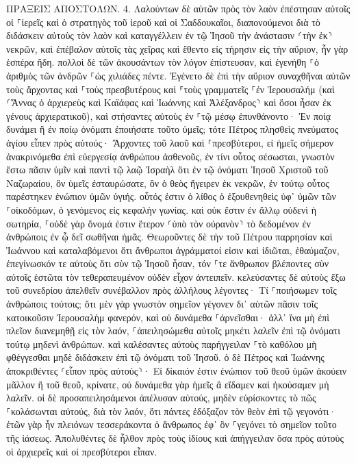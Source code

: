 \documentclass[twoside, 9pt]{extreport}
\begin{document}
ΠΡΑΞΕΙΣ ΑΠΟΣΤΟΛΩΝ.
4.
Λαλούντων δὲ αὐτῶν πρὸς τὸν λαὸν ἐπέστησαν αὐτοῖς οἱ ⸀ἱερεῖς καὶ ὁ στρατηγὸς τοῦ ἱεροῦ καὶ οἱ Σαδδουκαῖοι, 
διαπονούμενοι διὰ τὸ διδάσκειν αὐτοὺς τὸν λαὸν καὶ καταγγέλλειν ἐν τῷ Ἰησοῦ τὴν ἀνάστασιν ⸂τὴν ἐκ⸃ νεκρῶν, 
καὶ ἐπέβαλον αὐτοῖς τὰς χεῖρας καὶ ἔθεντο εἰς τήρησιν εἰς τὴν αὔριον, ἦν γὰρ ἑσπέρα ἤδη. 
πολλοὶ δὲ τῶν ἀκουσάντων τὸν λόγον ἐπίστευσαν, καὶ ἐγενήθη ⸀ὁ ἀριθμὸς τῶν ἀνδρῶν ⸀ὡς χιλιάδες πέντε. 
Ἐγένετο δὲ ἐπὶ τὴν αὔριον συναχθῆναι αὐτῶν τοὺς ἄρχοντας καὶ ⸀τοὺς πρεσβυτέρους καὶ ⸁τοὺς γραμματεῖς ⸀ἐν Ἰερουσαλήμ 
(καὶ ⸂Ἅννας ὁ ἀρχιερεὺς καὶ Καϊάφας καὶ Ἰωάννης καὶ Ἀλέξανδρος⸃ καὶ ὅσοι ἦσαν ἐκ γένους ἀρχιερατικοῦ), 
καὶ στήσαντες αὐτοὺς ἐν ⸀τῷ μέσῳ ἐπυνθάνοντο· Ἐν ποίᾳ δυνάμει ἢ ἐν ποίῳ ὀνόματι ἐποιήσατε τοῦτο ὑμεῖς; 
τότε Πέτρος πλησθεὶς πνεύματος ἁγίου εἶπεν πρὸς αὐτούς· Ἄρχοντες τοῦ λαοῦ καὶ ⸀πρεσβύτεροι, 
εἰ ἡμεῖς σήμερον ἀνακρινόμεθα ἐπὶ εὐεργεσίᾳ ἀνθρώπου ἀσθενοῦς, ἐν τίνι οὗτος σέσωσται, 
γνωστὸν ἔστω πᾶσιν ὑμῖν καὶ παντὶ τῷ λαῷ Ἰσραὴλ ὅτι ἐν τῷ ὀνόματι Ἰησοῦ Χριστοῦ τοῦ Ναζωραίου, ὃν ὑμεῖς ἐσταυρώσατε, ὃν ὁ θεὸς ἤγειρεν ἐκ νεκρῶν, ἐν τούτῳ οὗτος παρέστηκεν ἐνώπιον ὑμῶν ὑγιής. 
οὗτός ἐστιν ὁ λίθος ὁ ἐξουθενηθεὶς ὑφ᾽ ὑμῶν τῶν ⸀οἰκοδόμων, ὁ γενόμενος εἰς κεφαλὴν γωνίας. 
καὶ οὐκ ἔστιν ἐν ἄλλῳ οὐδενὶ ἡ σωτηρία, ⸀οὐδὲ γὰρ ὄνομά ἐστιν ἕτερον ⸂ὑπὸ τὸν οὐρανὸν⸃ τὸ δεδομένον ἐν ἀνθρώποις ἐν ᾧ δεῖ σωθῆναι ἡμᾶς. 
Θεωροῦντες δὲ τὴν τοῦ Πέτρου παρρησίαν καὶ Ἰωάννου καὶ καταλαβόμενοι ὅτι ἄνθρωποι ἀγράμματοί εἰσιν καὶ ἰδιῶται, ἐθαύμαζον, ἐπεγίνωσκόν τε αὐτοὺς ὅτι σὺν τῷ Ἰησοῦ ἦσαν, 
τόν ⸀τε ἄνθρωπον βλέποντες σὺν αὐτοῖς ἑστῶτα τὸν τεθεραπευμένον οὐδὲν εἶχον ἀντειπεῖν. 
κελεύσαντες δὲ αὐτοὺς ἔξω τοῦ συνεδρίου ἀπελθεῖν συνέβαλλον πρὸς ἀλλήλους 
λέγοντες· Τί ⸀ποιήσωμεν τοῖς ἀνθρώποις τούτοις; ὅτι μὲν γὰρ γνωστὸν σημεῖον γέγονεν δι᾽ αὐτῶν πᾶσιν τοῖς κατοικοῦσιν Ἰερουσαλὴμ φανερόν, καὶ οὐ δυνάμεθα ⸀ἀρνεῖσθαι· 
ἀλλ᾽ ἵνα μὴ ἐπὶ πλεῖον διανεμηθῇ εἰς τὸν λαόν, ⸀ἀπειλησώμεθα αὐτοῖς μηκέτι λαλεῖν ἐπὶ τῷ ὀνόματι τούτῳ μηδενὶ ἀνθρώπων. 
καὶ καλέσαντες αὐτοὺς παρήγγειλαν ⸀τὸ καθόλου μὴ φθέγγεσθαι μηδὲ διδάσκειν ἐπὶ τῷ ὀνόματι τοῦ Ἰησοῦ. 
ὁ δὲ Πέτρος καὶ Ἰωάννης ἀποκριθέντες ⸂εἶπον πρὸς αὐτούς⸃· Εἰ δίκαιόν ἐστιν ἐνώπιον τοῦ θεοῦ ὑμῶν ἀκούειν μᾶλλον ἢ τοῦ θεοῦ, κρίνατε, 
οὐ δυνάμεθα γὰρ ἡμεῖς ἃ εἴδαμεν καὶ ἠκούσαμεν μὴ λαλεῖν. 
οἱ δὲ προσαπειλησάμενοι ἀπέλυσαν αὐτούς, μηδὲν εὑρίσκοντες τὸ πῶς ⸀κολάσωνται αὐτούς, διὰ τὸν λαόν, ὅτι πάντες ἐδόξαζον τὸν θεὸν ἐπὶ τῷ γεγονότι· 
ἐτῶν γὰρ ἦν πλειόνων τεσσεράκοντα ὁ ἄνθρωπος ἐφ᾽ ὃν ⸀γεγόνει τὸ σημεῖον τοῦτο τῆς ἰάσεως. 
Ἀπολυθέντες δὲ ἦλθον πρὸς τοὺς ἰδίους καὶ ἀπήγγειλαν ὅσα πρὸς αὐτοὺς οἱ ἀρχιερεῖς καὶ οἱ πρεσβύτεροι εἶπαν. 
\end{document}
